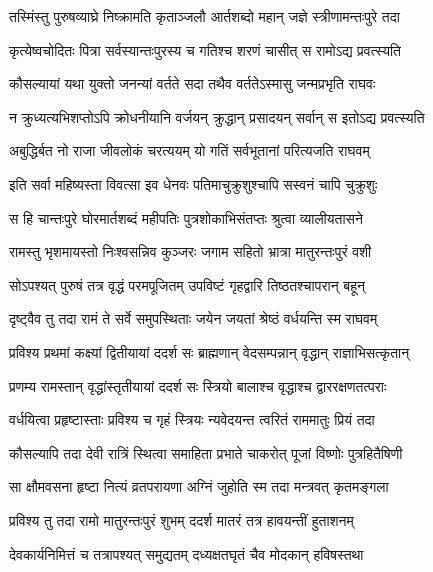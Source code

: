 
\twolineshloka
{तस्मिंस्तु पुरुषव्याघ्रे निष्क्रामति कृताञ्जलौ}
{आर्तशब्दो महान् जज्ञे स्त्रीणामन्तःपुरे तदा} %

\twolineshloka
{कृत्येष्वचोदितः पित्रा सर्वस्यान्तःपुरस्य च}
{गतिश्च शरणं चासीत् स रामोऽद्य प्रवत्स्यति} %

\twolineshloka
{कौसल्यायां यथा युक्तो जनन्यां वर्तते सदा}
{तथैव वर्ततेऽस्मासु जन्मप्रभृति राघवः} %

\twolineshloka
{न क्रुध्यत्यभिशप्तोऽपि क्रोधनीयानि वर्जयन्}
{क्रुद्धान् प्रसादयन् सर्वान् स इतोऽद्य प्रवत्स्यति} %

\twolineshloka
{अबुद्धिर्बत नो राजा जीवलोकं चरत्ययम्}
{यो गतिं सर्वभूतानां परित्यजति राघवम्} %

\twolineshloka
{इति सर्वा महिष्यस्ता विवत्सा इव धेनवः}
{पतिमाचुक्रुशुश्चापि सस्वनं चापि चुक्रुशुः} %

\twolineshloka
{स हि चान्तःपुरे घोरमार्तशब्दं महीपतिः}
{पुत्रशोकाभिसंतप्तः श्रुत्वा व्यालीयतासने} %

\twolineshloka
{रामस्तु भृशमायस्तो निःश्वसन्निव कुञ्जरः}
{जगाम सहितो भ्रात्रा मातुरन्तःपुरं वशी} %

\twolineshloka
{सोऽपश्यत् पुरुषं तत्र वृद्धं परमपूजितम्}
{उपविष्टं गृहद्वारि तिष्ठतश्चापरान् बहून्} %

\twolineshloka
{दृष्ट्वैव तु तदा रामं ते सर्वे समुपस्थिताः}
{जयेन जयतां श्रेष्ठं वर्धयन्ति स्म राघवम्} %

\twolineshloka
{प्रविश्य प्रथमां कक्ष्यां द्वितीयायां ददर्श सः}
{ब्राह्मणान् वेदसम्पन्नान् वृद्धान् राज्ञाभिसत्कृतान्} %

\twolineshloka
{प्रणम्य रामस्तान् वृद्धांस्तृतीयायां ददर्श सः}
{स्त्रियो बालाश्च वृद्धाश्च द्वाररक्षणतत्पराः} %

\twolineshloka
{वर्धयित्वा प्रहृष्टास्ताः प्रविश्य च गृहं स्त्रियः}
{न्यवेदयन्त त्वरितं राममातुः प्रियं तदा} %

\twolineshloka
{कौसल्यापि तदा देवी रात्रिं स्थित्वा समाहिता}
{प्रभाते चाकरोत् पूजां विष्णोः पुत्रहितैषिणी} %

\twolineshloka
{सा क्षौमवसना हृष्टा नित्यं व्रतपरायणा}
{अग्निं जुहोति स्म तदा मन्त्रवत् कृतमङ्गला} %

\twolineshloka
{प्रविश्य तु तदा रामो मातुरन्तःपुरं शुभम्}
{ददर्श मातरं तत्र हावयन्तीं हुताशनम्} %

\twolineshloka
{देवकार्यनिमित्तं च तत्रापश्यत् समुद्यतम्}
{दध्यक्षतघृतं चैव मोदकान् हविषस्तथा} %

